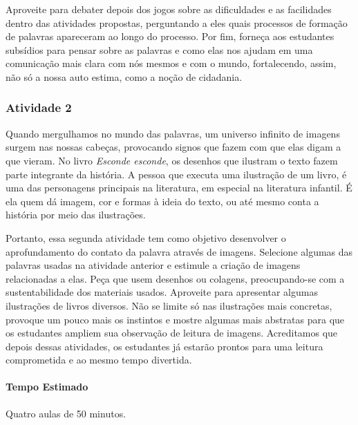 \documentclass[11pt]{extarticle}
\begin{document}
Aproveite para debater depois dos jogos sobre as dificuldades e as facilidades dentro das atividades propostas, perguntando a eles quais processos de formação de palavras apareceram ao longo do processo. Por fim, forneça aos estudantes subsídios para pensar sobre as palavras e como elas nos ajudam em uma comunicação mais clara com nós mesmos e com o mundo, fortalecendo, assim, não só a nossa auto estima, como a noção de cidadania.

\subsubsection{Atividade 2}


Quando mergulhamos no mundo das palavras, um universo infinito de imagens surgem nas nossas cabeças, provocando signos que fazem com que elas digam a que vieram. No livro \textit{Esconde esconde}, os desenhos que ilustram o texto fazem parte integrante da história. A pessoa que executa uma ilustração de um livro, é uma das personagens principais na literatura, em especial na literatura infantil. É ela quem dá imagem, cor e formas à ideia do texto, ou até mesmo conta a história por meio das ilustrações. 

Portanto, essa segunda atividade tem como objetivo desenvolver o aprofundamento do contato da palavra através de imagens. Selecione algumas das palavras usadas na atividade anterior e estimule a criação de imagens relacionadas a elas. Peça que usem desenhos ou colagens, preocupando-se com a sustentabilidade dos materiais usados. Aproveite para apresentar algumas ilustrações de livros diversos. Não se limite só nas ilustrações mais concretas, provoque um pouco mais os instintos e mostre algumas mais abstratas para que os estudantes ampliem sua observação de leitura de imagens. Acreditamos que depois dessas atividades, os estudantes já estarão prontos para uma leitura comprometida e ao mesmo tempo divertida. 

\paragraph{Tempo Estimado} Quatro aulas de 50 minutos. 
\end{document}
